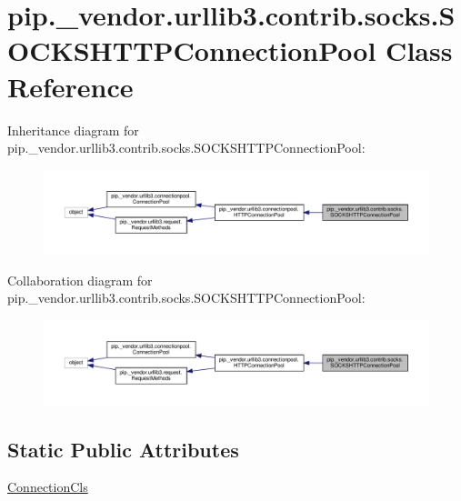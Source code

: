 \hypertarget{classpip_1_1__vendor_1_1urllib3_1_1contrib_1_1socks_1_1SOCKSHTTPConnectionPool}{}\section{pip.\+\_\+vendor.\+urllib3.\+contrib.\+socks.\+S\+O\+C\+K\+S\+H\+T\+T\+P\+Connection\+Pool Class Reference}
\label{classpip_1_1__vendor_1_1urllib3_1_1contrib_1_1socks_1_1SOCKSHTTPConnectionPool}


Inheritance diagram for pip.\+\_\+vendor.\+urllib3.\+contrib.\+socks.\+S\+O\+C\+K\+S\+H\+T\+T\+P\+Connection\+Pool\+:
\nopagebreak
\begin{figure}[H]
\begin{center}
\leavevmode
\includegraphics[width=350pt]{classpip_1_1__vendor_1_1urllib3_1_1contrib_1_1socks_1_1SOCKSHTTPConnectionPool__inherit__graph}
\end{center}
\end{figure}


Collaboration diagram for pip.\+\_\+vendor.\+urllib3.\+contrib.\+socks.\+S\+O\+C\+K\+S\+H\+T\+T\+P\+Connection\+Pool\+:
\nopagebreak
\begin{figure}[H]
\begin{center}
\leavevmode
\includegraphics[width=350pt]{classpip_1_1__vendor_1_1urllib3_1_1contrib_1_1socks_1_1SOCKSHTTPConnectionPool__coll__graph}
\end{center}
\end{figure}
\subsection*{Static Public Attributes}
\begin{DoxyCompactItemize}
\item 
\hyperlink{classpip_1_1__vendor_1_1urllib3_1_1contrib_1_1socks_1_1SOCKSHTTPConnectionPool_a55056c4a96f910b8a6986bcb61b69e94}{Connection\+Cls}
\end{DoxyCompactItemize}
